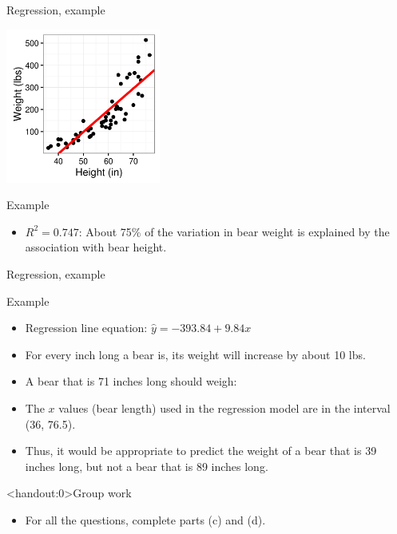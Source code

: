 \documentclass[xcolor=table, aspectratio=169, bigger]{beamer}
\begin{document}
\begin{frame}{Regression, example}

\smallskip
{\centering
\includegraphics[width=2in]{../images/ch10_reg_bears}
\par}

\pause
\begin{exampleblock}{Example}
\begin{itemize}
\item $R^2 = 0.747$: About 75\% of the variation in bear weight is explained by the association with bear height.
\end{itemize}
\end{exampleblock}

\end{frame}

\begin{frame}{Regression, example}
\begin{exampleblock}{Example}
\begin{itemize}
\item Regression line equation: $\hat y = -393.84 + 9.84 x$
\pause\item For every inch long a bear is, its weight will increase by about 10 lbs.
\pause\item A bear that is 71 inches long should weigh: \\
\pause\item The $x$ values (bear length) used in the regression model are in the interval (36, 76.5). 
\pause\item Thus, it would be appropriate to predict the weight of a bear that is 39 inches long, but not a bear that is 89 inches long.
\end{itemize}
\end{exampleblock}

\end{frame}

\begin{frame}<handout:0>{Group work}
\begin{block}{}
\begin{itemize}
\item For all the questions, complete parts (c) and (d).
\end{itemize}
\end{block}
\end{frame}
\end{document}
